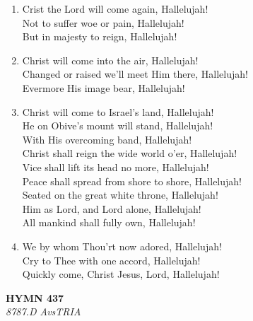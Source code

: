 \documentclass[11pt,a4paper]{article}
\begin{document}
\begin{enumerate}
    \item Crist the Lord will come again, Hallelujah! \\
        Not to suffer woe or pain, Hallelujah! \\
        But in majesty to reign, Hallelujah!

    \item Christ will come into the air, Hallelujah! \\
        Changed or raised we'll meet Him there, Hallelujah! \\
        Evermore His image bear, Hallelujah!

    \item Christ will come to Israel's land, Hallelujah! \\
        He on Obive's mount will stand, Hallelujah! \\
        With His overcoming band, Hallelujah! \\
        Christ shall reign the wide world o'er, Hallelujah! \\
        Vice shall lift its head no more, Hallelujah! \\
        Peace shall spread from shore to shore, Hallelujah! \\
        Seated on the great white throne, Hallelujah! \\
        Him as Lord, and Lord alone, Hallelujah! \\
        All mankind shall fully own, Hallelujah!

    \item We by whom Thou'rt now adored, Hallelujah! \\
        Cry to Thee with one accord, Hallelujah! \\
        Quickly come, Christ Jesus, Lord, Hallelujah!

\end{enumerate}

\newpage
\begin{center}
    {\Large \textbf{HYMN 437}}
    \\
    \textit{8787.D AvsTRIA}
\end{center}
\vspace{1em}
\end{document}
